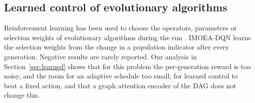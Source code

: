 \subsection{Learned control of evolutionary algorithms}
Reinforcement learning has been used to choose the operators, parameters or selection weights of evolutionary
algorithms during the run \citep{song2024rlea}. IMOEA-DQN \citep{jin2026imoeadqn} learns the selection weights from the
change in a population indicator after every generation. Negative results are rarely reported. Our analysis in
Section~\ref{sec:learned} shows that for this problem the per-generation reward is too noisy, and the room for an
adaptive schedule too small, for learned control to beat a fixed action, and that a graph attention encoder
\citep{velickovic2018gat} of the DAG does not change this.
